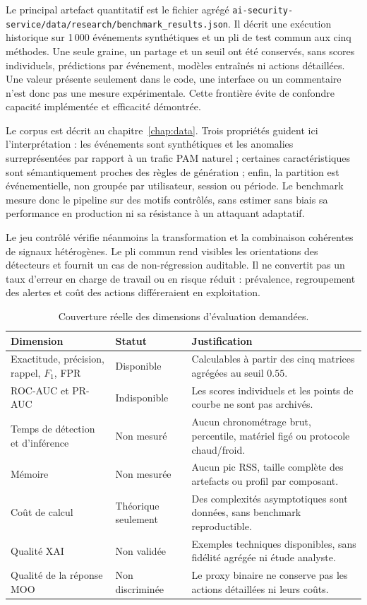 \documentclass[11pt,a4paper,oneside]{report}
\theoremstyle{definition}
\theoremstyle{plain}
\begin{document}
Le principal artefact quantitatif est le fichier agrégé
\texttt{ai-security-service/data/research/benchmark\_results.json}. Il décrit
une exécution historique sur 1\,000 événements synthétiques et un pli de test
commun aux cinq méthodes. Une seule graine, un partage et un seuil ont été
conservés, sans scores individuels, prédictions par événement, modèles
entraînés ni actions détaillées. Une valeur présente seulement dans le code,
une interface ou un commentaire n'est donc pas une mesure expérimentale. Cette
frontière évite de confondre capacité implémentée et efficacité démontrée.

Le corpus est décrit au chapitre~\ref{chap:data}. Trois propriétés guident ici
l'interprétation : les événements sont synthétiques et les anomalies
surreprésentées par rapport à un trafic PAM naturel ; certaines caractéristiques
sont sémantiquement proches des règles de génération ; enfin, la partition est
événementielle, non groupée par utilisateur, session ou période. Le benchmark
mesure donc le pipeline sur des motifs contrôlés, sans estimer sans biais sa
performance en production ni sa résistance à un attaquant adaptatif.

Le jeu contrôlé vérifie néanmoins la transformation et la combinaison cohérentes
de signaux hétérogènes. Le pli commun rend visibles les orientations des
détecteurs et fournit un cas de non-régression auditable. Il ne convertit pas
un taux d'erreur en charge de travail ou en risque réduit : prévalence,
regroupement des alertes et coût des actions différeraient en exploitation.

\begin{table}[H]
\centering
\small
\caption{Couverture réelle des dimensions d'évaluation demandées.}
\label{tab:validation-metric-coverage}
\begin{tabularx}{\textwidth}{@{}p{3.4cm}p{2.2cm}X@{}}
\toprule
\textbf{Dimension} & \textbf{Statut} & \textbf{Justification}\\
\midrule
Exactitude, précision, rappel, $F_1$, FPR & Disponible &
Calculables à partir des cinq matrices agrégées au seuil $0.55$.\\
ROC-AUC et PR-AUC & Indisponible &
Les scores individuels et les points de courbe ne sont pas archivés.\\
Temps de détection et d'inférence & Non mesuré &
Aucun chronométrage brut, percentile, matériel figé ou protocole chaud/froid.\\
Mémoire & Non mesurée &
Aucun pic RSS, taille complète des artefacts ou profil par composant.\\
Coût de calcul & Théorique seulement &
Des complexités asymptotiques sont données, sans benchmark reproductible.\\
Qualité XAI & Non validée &
Exemples techniques disponibles, sans fidélité agrégée ni étude analyste.\\
Qualité de la réponse MOO & Non discriminée &
Le proxy binaire ne conserve pas les actions détaillées ni leurs coûts.\\
\bottomrule
\end{tabularx}
\end{table}
\end{document}
